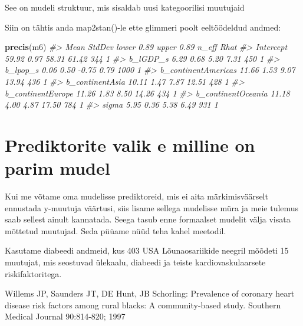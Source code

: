 \documentclass[]{book}
\newenvironment{Shaded}{\begin{snugshade}}{\end{snugshade}}
\newcommand{\KeywordTok}[1]{\textcolor[rgb]{0.13,0.29,0.53}{\textbf{#1}}}
\newcommand{\DataTypeTok}[1]{\textcolor[rgb]{0.13,0.29,0.53}{#1}}
\newcommand{\StringTok}[1]{\textcolor[rgb]{0.31,0.60,0.02}{#1}}
\newcommand{\CommentTok}[1]{\textcolor[rgb]{0.56,0.35,0.01}{\textit{#1}}}
\newcommand{\OperatorTok}[1]{\textcolor[rgb]{0.81,0.36,0.00}{\textbf{#1}}}
\newcommand{\NormalTok}[1]{#1}
\begin{document}
See on mudeli struktuur, mis sisaldab uusi kategoorilisi muutujaid

Siin on tähtis anda map2stan()-le ette glimmeri poolt eeltöödeldud
andmed:

\begin{Shaded}
\end{Shaded}

\begin{Shaded}
\begin{Highlighting}[]
\KeywordTok{precis}\NormalTok{(m6)}
\CommentTok{#>                      Mean StdDev lower 0.89 upper 0.89 n_eff Rhat}
\CommentTok{#> Intercept           59.92   0.97      58.31      61.42   344    1}
\CommentTok{#> b_lGDP_s             6.29   0.68       5.20       7.31   450    1}
\CommentTok{#> b_lpop_s             0.06   0.50      -0.75       0.79  1000    1}
\CommentTok{#> b_continentAmericas 11.66   1.53       9.07      13.94   436    1}
\CommentTok{#> b_continentAsia     10.11   1.47       7.87      12.51   428    1}
\CommentTok{#> b_continentEurope   11.26   1.83       8.50      14.26   434    1}
\CommentTok{#> b_continentOceania  11.18   4.00       4.87      17.50   784    1}
\CommentTok{#> sigma                5.95   0.36       5.38       6.49   931    1}
\end{Highlighting}
\end{Shaded}

\section{Prediktorite valik e milline on parim
mudel}\label{prediktorite-valik-e-milline-on-parim-mudel}

Kui me võtame oma mudelisse prediktoreid, mis ei aita märkimisväärselt
ennustada y-muutuja väärtusi, siis lisame sellega mudelisse müra ja meie
tulemus saab sellest ainult kannatada. Seega tasub enne formaalset
mudelit välja visata mõttetud muutujad. Seda püüame nüüd teha kahel
meetodil.

Kasutame diabeedi andmeid, kus 403 USA Lõunaosariikide neegril mõõdeti
15 muutujat, mis seostuvad ülekaalu, diabeedi ja teiste
kardiovaskulaarsete riskifaktoritega.

Willems JP, Saunders JT, DE Hunt, JB Schorling: Prevalence of coronary
heart disease risk factors among rural blacks: A community-based study.
Southern Medical Journal 90:814-820; 1997
\end{document}
